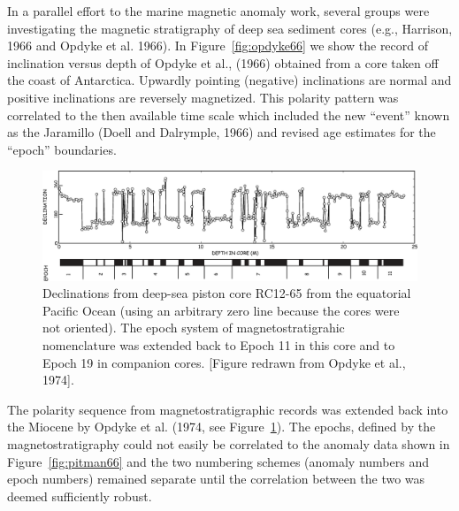 In a parallel effort to the marine magnetic anomaly work, several groups were investigating the magnetic stratigraphy of deep sea sediment cores (e.g.,
 Harrison, 1966 and 
 Opdyke et al. 1966).   In Figure~\ref{fig:opdyke66} \nocite{opdyke66} we show the record of inclination versus depth of Opdyke et al., (1966) obtained from  a core taken off the coast of Antarctica.    Upwardly pointing (negative)  inclinations are  normal and positive inclinations are reversely magnetized. This polarity pattern was correlated  to the then  available time scale which included the new ``event'' known as the Jaramillo 
(Doell  and Dalrymple, 1966) \nocite{doell66} and revised age estimates for the ``epoch'' boundaries.   \nocite{harrison66} \nocite{opdyke66}  


\begin{figure}[h!tb]
\centering  \includegraphics[width=14 cm]{EPSfiles/opdyke74.eps}
\caption{Declinations from deep-sea piston core RC12-65 from the equatorial Pacific Ocean (using an arbitrary zero line because the cores were not oriented).  The epoch system of magnetostratigrahic nomenclature was extended back to Epoch 11 in this core and to Epoch 19 in companion cores.   [Figure  redrawn from Opdyke et al., 1974].}
\label{fig:opdyke74}
\end{figure}


The polarity sequence from magnetostratigraphic records was extended back into the Miocene by Opdyke et al.  (1974, see Figure~\ref{fig:opdyke74}).  The epochs, defined by the magnetostratigraphy could not easily be correlated to the anomaly data shown in Figure~\ref{fig:pitman66} and the two numbering schemes (anomaly numbers and epoch numbers) remained separate until the correlation between the two was deemed sufficiently robust.  



